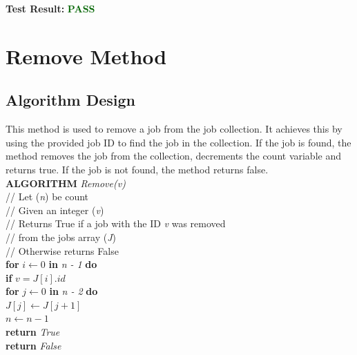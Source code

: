 \documentclass[12pt,a4paper]{article}
\begin{document}
			\textbf{Test Result:} \textbf{\textcolor{darkgreen}{PASS}}\\

	\newpage

	\section{Remove Method}
		\subsection{Algorithm Design}
			This method is used to remove a job from the job collection. It achieves this by using the 
			provided job ID to find the job in the collection. If the job is found, the method removes the 
			job from the collection, decrements the count variable and returns true. If the job is not found, 
			the method returns false.\\

			\textbf{ALGORITHM} \textit{Remove(v)}\\
			\null\hspace{1cm}// Let (\textit{n}) be count\\
			\null\hspace{1cm}// Given an integer (\textit{v})\\
			\null\hspace{1cm}// Returns True if a job with the ID \textit{v} was removed\\
			\null\hspace{1cm}// from the jobs array (\textit{J})\\
			\null\hspace{1cm}// Otherwise returns False\\
			\null\hspace{1cm}\textbf{for} \textit{$i \gets 0$} \textbf{in} \textit{n - 1} \textbf{do}\\
			\null\hspace{2cm}\textbf{if} \textit{$v = J[i].id$}\\
			\null\hspace{4cm}\textbf{for} \textit{$j \gets 0$} \textbf{in} \textit{n - 2} \textbf{do}\\
			\null\hspace{5cm}\textit{$J[j] \gets J[j + 1]$}\\
			\null\hspace{4cm}\textit{$n \gets n - 1$}\\
			\null\hspace{4cm}\textbf{return} \textit{True}\\
			\null\hspace{1cm}\textbf{return} \textit{False}\\
			
\end{document}
